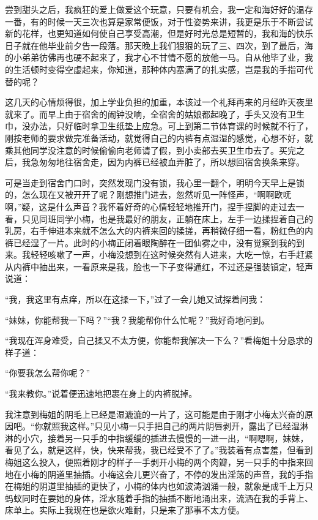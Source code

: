 \documentclass[12pt,UTF8]{ctexbook}
\begin{document}
尝到甜头之后，我疯狂的爱上做爱这个玩意，只要有机会，我一定和海好好的温存一番，有的时候一天三次也算是家常便饭，对于性姿势来讲，我更是乐于不断尝试新的花样，也更知道如何使自己享受高潮，但是好时光总是短暂的，我和海的快乐日子就在他毕业前夕告一段落。那天晚上我们狠狠的玩了三、四次，到了最后，海的小弟弟彷佛再也硬不起来了，我才心不甘情不愿的放他一马。自从他毕了业，我的生活顿时变得空虚起来，你知道，那种体内塞满了的扎实感，岂是我的手指可代替的呢？

这几天的心情烦得很，加上学业负担的加重，本该过一个礼拜再来的月经昨天夜里就来了。而早上由于宿舍的闹钟没响，全宿舍的姑娘都起晚了，手头又没有卫生巾，没办法，只好临时拿卫生纸垫上应急。可上到第二节体育课的时候就不行了，刚按老师的要求做完准备活动，就觉得自己的内裤有点湿湿的感觉，心想不好，就乘其他同学没注意的时候偷偷向老师请了假，到小卖部去买卫生巾去了。买完之后，我急匆匆地往宿舍走，因为内裤已经被血弄脏了，所以想回宿舍换条来穿。

可是当走到宿舍门口时，突然发现门没有锁，我心里一翻个，明明今天早上是锁的，怎么现在又被开开了呢？刚想推门进去，忽然听见一阵怪声，“啊啊欧呒啊，”疑，这是什么声音？我怀着好奇的心情轻轻地推开门，捏手捏脚的走过去一看，只见同班同学小梅，也是我最好的朋友，正躺在床上，左手一边揉捏着自己的乳房，右手伸进本来就不怎么大的内裤来回的揉搓，再稍微仔细一看，粉红色的内裤已经湿了一片。此时的小梅正闭着眼陶醉在一团仙雾之中，没有觉察到我的到来。我轻轻咳嗽了一声，小梅没想到在这时候突然有人进来，大吃一惊，右手赶紧从内裤中抽出来，一看原来是我，脸也一下子变得通红，不过还是强装镇定，轻声说道：

“我，我这里有点痒，所以在这揉一下，”过了一会儿她又试探着问我：

“妹妹，你能帮我一下吗？”“我？我能帮你什么忙呢？”我好奇地问到。

“我现在浑身难受，自己揉又不太方便，你能帮我解决一下么？”看梅姐十分恳求的样子道：

“你要我怎么帮你呢？”

“我来教你。”说着便迅速地把裹在身上的内裤脱掉。

我注意到梅姐的阴毛上已经是湿漉漉的一片了，这可能是由于刚才小梅太兴奋的原因吧。“你就照我这样。”只见小梅一只手把自己的两片阴唇剥开，露出了已经湿淋淋的小穴，接着另一只手的中指缓缓的插进去慢慢的一进一出，“啊嗯啊，妹妹，看见了么，就是这样，快，快来帮我，我已经受不了了。”我装着有点害羞，但看到梅姐这么投入，便照着刚才的样子一手剥开小梅的两个肉瓣，另一只手的中指来回地在小梅的阴道里抽插。小梅这会儿更兴奋了，不停的发出淫荡的声音，我的手指在梅姐的阴道里抽插的更快了，小梅的体内也如波涛汹涌一般，就象是成千上万只蚂蚁同时在要她的身体，淫水随着手指的抽插不断地涌出来，流洒在我的手背上、床单上。实际上我现在也是欲火难耐，只是来了那事不太方便。
\end{document}
